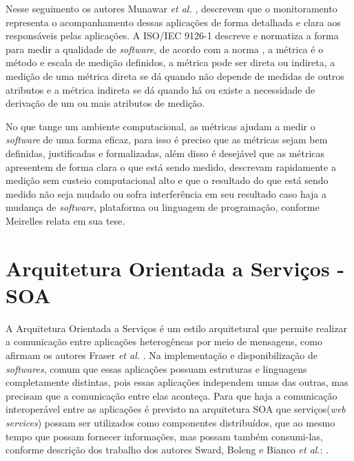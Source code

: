 Nesse seguimento os autores Munawar \textit{et al.} \cite{5298441}, descrevem que o monitoramento representa o acompanhamento dessas aplicações de forma detalhada e clara aos responsáveis pelas aplicações. A ISO/IEC 9126-1 \cite{associaccao2003nbr} descreve e normatiza a forma para medir a qualidade de \textit{software}, de acordo com a norma \cite{associaccao2003nbr}, a métrica é o método e escala de medição definidos, a métrica pode ser direta ou indireta, a medição de uma métrica direta se dá quando não depende de medidas de outros atributos e a métrica indireta se dá quando há ou existe a necessidade de derivação de um ou mais atributos de medição.

No que tange um ambiente computacional, as métricas ajudam a medir o \textit{software} de uma forma eficaz, para isso é preciso que as métricas sejam bem definidas, justificadas e formalizadas, além disso é desejável que as métricas apresentem de forma clara o que está sendo medido, descrevam rapidamente a medição sem custeio computacional alto e que o resultado do que está sendo medido não seja mudado ou sofra interferência em seu resultado caso haja a mudança de \textit{software}, plataforma ou linguagem de programação, conforme Meirelles \cite{meirelles2013monitoramento} relata em sua tese.


\section{Arquitetura Orientada a Serviços - SOA}

A Arquitetura Orientada a Serviços é um estilo arquitetural que permite realizar a comunicação entre aplicações heterogêneas por meio de mensagens, como afirmam os autores Fraser \textit{et al.} \cite{fraser2007service}. Na implementação e disponibilização de \textit{softwares}, comum que essas aplicações possuam estruturas e linguagens completamente distintas, pois essas aplicações independem umas das outras, mas precisam que a comunicação entre elas aconteça. Para que haja a comunicação interoperável entre as aplicações é previsto na arquitetura \acrshort{SOA} que serviços(\textit{web services}) possam ser utilizados como componentes distribuídos, que ao mesmo tempo que possam fornecer informações, mas possam também consumi-las, conforme descrição dos trabalho dos autores Sward,  Boleng e Bianco \textit{et al.}: \cite{sward2011service,bianco2011architecting}.

